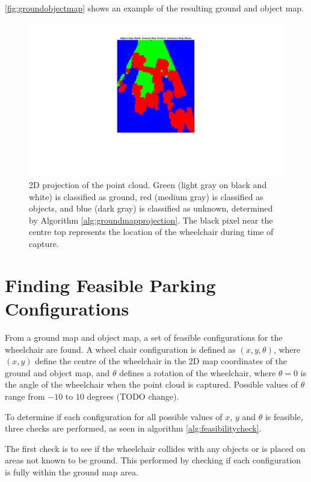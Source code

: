 \autoref{fig:groundobjectmap} shows an example of the resulting ground and
object map.

\begin{figure}
\centering
\includegraphics[width=5in]{figures/groundobjectmap.png}
\caption{2D projection of the point cloud. Green (light gray on black and white)
is classified as ground, red (medium gray) is classified as objects, and blue
(dark gray) is classified as unknown, determined by Algorithm
\autoref{alg:groundmapprojection}. The black pixel near the centre top
represents the location of the wheelchair during time of capture.}
\label{fig:groundobjectmap}
\end{figure}

\section{Finding Feasible Parking Configurations}
\label{sec:feasibleparkingspot}
From a ground map and object map, a set of feasible configurations for the
wheelchair are found. A wheel chair configuration is defined as $(x,y,\theta)$,
where $(x,y)$ define the centre of the wheelchair in the 2D map coordinates of
the ground and object map, and $\theta$ defines a rotation of the wheelchair,
where $\theta = 0$ is the angle of the wheelchair when the point cloud is
captured. Possible values of $\theta$ range from $-10$ to $10$ degrees (TODO
change).

To determine if each configuration for all possible values of $x$, $y$ and
$\theta$ is feasible, three checks are performed, as seen in algorithm
\autoref{alg:feasibilitycheck}. 

The first check is to see if the wheelchair
collides with any objects or is placed on areas not known to be ground. This
performed by checking if each configuration is fully within the ground map area.


